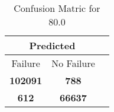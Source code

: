 \begin{table}[] 
\caption{Confusion Matric for 80.0} 
\label{Table: Prediction Accuracy-DMD80.0OnlySunEKF-combinationReflectionEKF-top2perfectNoFailurePrediction-Reflection} 
\centering 
\begin{tabular} 
 {@{}ccc@{}} 
\toprule 
\multicolumn{2}{c}{\textbf{Predicted}}
 \\ \midrule 
\multicolumn{1}{|c|}{Failure} & 
\multicolumn{1}{c|}{No Failure}
 \\ \midrule 
\multicolumn{1}{|c|}{\color{green}\textbf{102091}} & 
\multicolumn{1}{c|}{\color{red}\textbf{788}}
 \\ \midrule 
\multicolumn{1}{|c|}{\color{red}\textbf{612}} & 
\multicolumn{1}{c|}{\color{green}\textbf{66637}}
 \\ \bottomrule 
\end{tabular} 
\end{table} 
